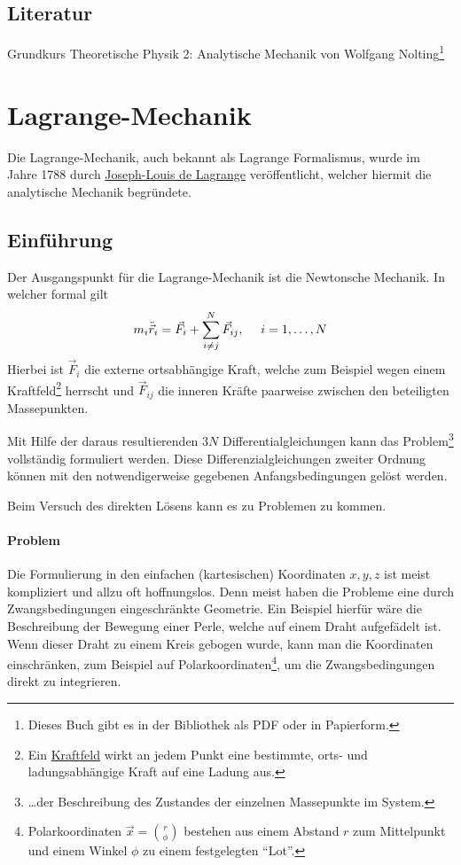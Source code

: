 \subsection{Literatur} Grundkurs Theoretische Physik 2: Analytische Mechanik von Wolfgang Nolting\footnote{Dieses Buch gibt es in der Bibliothek als PDF oder in Papierform.}



\section{Lagrange-Mechanik}

Die Lagrange-Mechanik, auch bekannt als Lagrange Formalismus, wurde im Jahre 1788 durch \href{http://de.wikipedia.org/wiki/Joseph-Louis_Lagrange}{Joseph-Louis de Lagrange} veröffentlicht, welcher hiermit die analytische Mechanik begründete. 

\subsection{Einführung}
Der Ausgangspunkt für die Lagrange-Mechanik ist die Newtonsche Mechanik. In welcher formal gilt
$$ m_i \ddot{\vec{r}}_i = \vec{F}_i + \sum_{i \neq j}^{N} \vec{F}_{ij}, ~~~~i = 1, \dots, N$$
Hierbei ist $\vec{F}_i$ die externe ortsabhängige Kraft, welche zum Beispiel wegen einem Kraftfeld\footnote{Ein \href{http://de.wikipedia.org/wiki/Kraftfeld}{Kraftfeld} wirkt an jedem Punkt eine bestimmte, orts- und ladungsabhängige Kraft auf eine Ladung aus.} herrscht und $\vec{F}_{ij}$ die inneren Kräfte paarweise zwischen den beteiligten Massepunkten.

Mit Hilfe der daraus resultierenden $3N$ Differentialgleichungen kann das Problem\footnote{\dots der Beschreibung des Zustandes der einzelnen Massepunkte im System.} vollständig formuliert werden. Diese Differenzialgleichungen zweiter Ordnung können mit den notwendigerweise gegebenen Anfangsbedingungen gelöst werden.

Beim Versuch des direkten Lösens kann es zu Problemen zu kommen. 

\paragraph{Problem} Die Formulierung in den einfachen (kartesischen) Koordinaten $x, y, z$ ist meist kompliziert und allzu oft hoffnungslos.
Denn meist haben die Probleme eine durch Zwangsbedingungen eingeschränkte Geometrie. Ein Beispiel hierfür wäre die Beschreibung der Bewegung einer Perle, welche auf einem Draht aufgefädelt ist. Wenn dieser Draht zu einem Kreis gebogen wurde, kann man die Koordinaten einschränken, zum Beispiel auf Polarkoordinaten\footnote{Polarkoordinaten $\vec{x} = \binom{r}{\phi}$ bestehen aus einem Abstand $r$ zum Mittelpunkt und einem Winkel $\phi$ zu einem festgelegten "`Lot"'.}, um die Zwangsbedingungen direkt zu integrieren.

